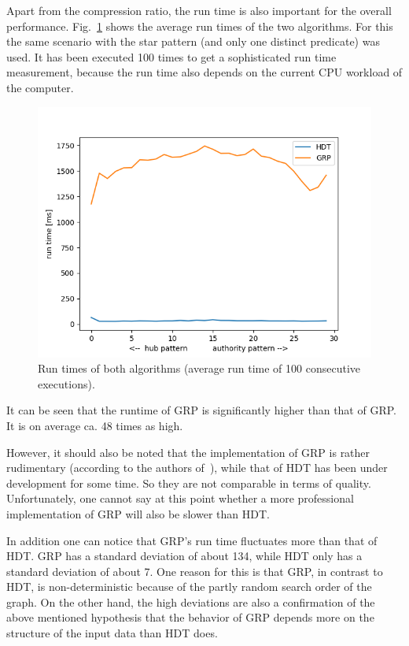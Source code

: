 Apart from the compression ratio, the run time is also important for the overall performance. Fig.~\ref{fig:runtimes} shows the average run times of the two algorithms. For this the same scenario with the star pattern (and only one distinct predicate) was used. It has been executed 100 times to get a sophisticated run time measurement, because the run time also depends on the current CPU workload of the computer.

\begin{figure}
	\centering
	\includegraphics[width=0.7\linewidth]{figures/GRPvsHDT/runtimes}
	\caption{Run times of both algorithms (average run time of 100 consecutive executions).}
	\label{fig:runtimes}
\end{figure}


It can be seen that the runtime of GRP is significantly higher than that of GRP. It is on average ca. 48 times as high.

However, it should also be noted that the implementation of GRP is rather rudimentary  (according to the authors of~\cite{maneth}), while that of HDT has been under development for some time. So they are not comparable in terms of quality. Unfortunately, one cannot say at this point whether a more professional implementation of GRP will also be slower than HDT.

In addition one can notice that GRP's run time fluctuates more than that of HDT. GRP has a standard deviation of about 134, while HDT only has a standard deviation of about 7. One reason for this is that GRP, in contrast to HDT, is non-deterministic because of the partly random search order of the graph. On the other hand, the high deviations are also a confirmation of the above mentioned hypothesis that the behavior of GRP depends more on the structure of the input data than HDT does.
























